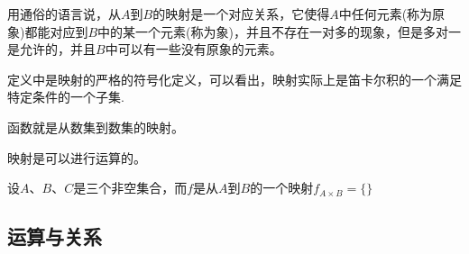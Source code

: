 用通俗的语言说，从$A$到$B$的映射是一个对应关系，它使得$A$中任何元素(称为原象)都能对应到$B$中的某一个元素(称为象)，并且不存在一对多的现象，但是多对一是允许的，并且$B$中可以有一些没有原象的元素。

定义中是映射的严格的符号化定义，可以看出，映射实际上是笛卡尔积的一个满足特定条件的一个子集.

函数就是从数集到数集的映射。

映射是可以进行运算的。
\begin{definition}
设$A$、$B$、$C$是三个非空集合，而$f$是从$A$到$B$的一个映射$f_{A \times B} = \{ \}$
\end{definition}

\subsection{运算与关系}
\label{sec:relation}




